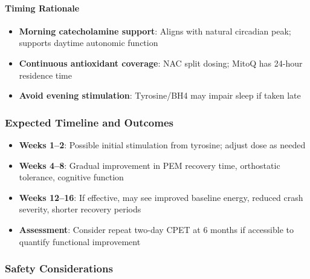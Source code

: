 \paragraph{Timing Rationale}

\begin{itemize}
    \item \textbf{Morning catecholamine support}: Aligns with natural circadian peak; supports daytime autonomic function
    \item \textbf{Continuous antioxidant coverage}: NAC split dosing; MitoQ has 24-hour residence time
    \item \textbf{Avoid evening stimulation}: Tyrosine/BH4 may impair sleep if taken late
\end{itemize}

\subsubsection{Expected Timeline and Outcomes}

\begin{itemize}
    \item \textbf{Weeks 1--2}: Possible initial stimulation from tyrosine; adjust dose as needed
    \item \textbf{Weeks 4--8}: Gradual improvement in PEM recovery time, orthostatic tolerance, cognitive function
    \item \textbf{Weeks 12--16}: If effective, may see improved baseline energy, reduced crash severity, shorter recovery periods
    \item \textbf{Assessment}: Consider repeat two-day CPET at 6 months if accessible to quantify functional improvement
\end{itemize}

\subsubsection{Safety Considerations}

